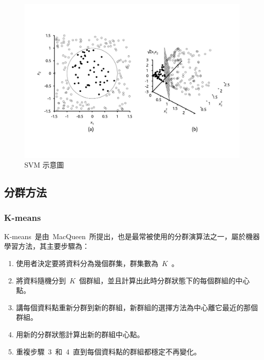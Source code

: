 \begin{figure}[hbtp]
  \begin{center}
    \includegraphics[width=1.0\textwidth]{figures/svm.jpg}
    \caption{SVM 示意圖\cite{verplancke2008support}} 
    \label{fig:svm}
  \end{center}
\end{figure}

\subsection{分群方法}

\subsubsection{K-means}

K-means~是由~MacQueen\cite{macqueen67}~所提出，也是最常被使用的分群演算法之一，屬於機器學習方法，其主要步驟為：

\begin{enumerate}
\item 使用者決定要將資料分為幾個群集，群集數為~$K$~。
\item 將資料隨機分到~$K$~個群組，並且計算出此時分群狀態下的每個群組的中心點。
\item 講每個資料點重新分群到新的群組，新群組的選擇方法為中心離它最近的那個群組。
\item 用新的分群狀態計算出新的群組中心點。
\item 重複步驟~3~和~4~直到每個資料點的群組都穩定不再變化。
\end{enumerate}




